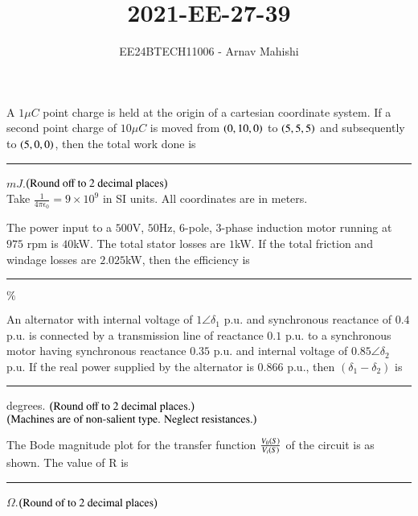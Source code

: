 \documentclass[journal]{IEEEtran}
\begin{document}

\vspace{3cm}

\title{2021-EE-27-39}
\author{EE24BTECH11006 - Arnav Mahishi}
{\let\newpage\relax\maketitle}
\begin{enumerate}
\item{
 A $1\mu C$ point charge is held at the origin of a cartesian coordinate system. If a second point charge of $10\mu C$ is moved from $\left(0,10,0\right)$ to $\left(5,5,5\right)$ and subsequently to $\left(5,0,0\right)$, then the total work done is \rule{2cm}{0.15mm}$mJ$.$\left(\text{Round off to $2$ decimal places}\right)$\\
 Take $\frac{1}{4\pi\epsilon_{0}}=9\times 10^9$ in SI units. All coordinates are in meters.
 \\
}
\item{
The power input to a $500$V, $50$Hz, $6$-pole, $3$-phase induction motor running at $975$ rpm is $40$kW. The total stator losses are $1$kW. If the total friction and windage losses are $2.025$kW, then the efficiency is \rule{2cm}{0.15mm}$\%$ 
\\
\item{
An alternator with internal voltage of $1\angle\delta_1$ p.u. and synchronous reactance of $0.4$ p.u. is connected by a transmission line of reactance $0.1$ p.u. to a synchronous motor having synchronous reactance $0.35$ p.u. and internal voltage of $0.85\angle\delta_2$ p.u. If the real power supplied by the alternator is $0.866$ p.u., then $(\delta_1 - \delta_2)$ is \rule{2cm}{0.15mm} degrees. $\left(\text{Round off to 2 decimal places.}\right)$\\
$\left(\text{Machines are of non-salient type. Neglect resistances.}\right)$
\\
}
\item{
The Bode magnitude plot for the transfer function $\frac{V_0\left(S\right)}{V_i\left(S\right)}$ of the circuit is as shown. The value of R is \rule{2cm}{0.15mm}$\Omega$.$\left(\text{Round of to $2$ decimal places}\right)$
\begin{figure}[H]
\centering
{}
\end{figure}}}
\end{enumerate}
\end{document}
